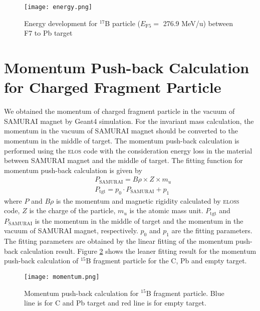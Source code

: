 \begin{figure}[h]
    \centering
    \texttt{[image: energy.png]}
    \caption{Energy development for $^{17}$B particle ($E_{\text{F5}} =$ 276.9 MeV/u) between F7 to Pb target}
    \label{fig:elos}
\end{figure}


\section{Momentum Push-back Calculation for Charged Fragment Particle}
We obtained the momentum of charged fragment particle in the vacuum of SAMURAI magnet by Geant4 simulation. For the invariant mass calculation, the momentum in the vacuum of SAMURAI magnet should be converted to the momentum in the middle of target. The momentum push-back calculation is performed using the \textsc{elos} code with the consideration energy loss in the material between SAMURAI magnet and the middle of target. The fitting function for momentum push-back calculation is given by
\begin{align}
    &P_{\text{SAMURAI}} = B\rho \times Z \times m_u\\
    &P_{\text{tgt}} = p_0 \cdot P_{\text{SAMURAI}} + p_1
\end{align}
where $P$ and $B\rho$ is the momentum and magnetic rigidity calculated by \textsc{eloss} code, $Z$ is the charge of the particle, $m_u$ is the atomic mass unit. $P_{\text{tgt}}$ and $P_{\text{SAMURAI}}$ is the momentum in the middle of target and the momentum in the vacuum of SAMURAI magnet, respectively. $p_0$ and $p_1$ are the fitting parameters. The fitting parameters are obtained by the linear fitting of the momentum push-back calculation result. Figure \ref{fig:momentum_pushback} shows the leaner fitting result for the momentum push-back calculation of $^{15}$B fragment particle for the C, Pb and empty target.

\begin{figure}[h]
    \centering
    \texttt{[image: momentum.png]}
    \caption[Momentum push-back calculation for $^{15}$B fragment particle]{Momentum push-back calculation for $^{15}$B fragment particle. Blue line is for C and Pb target and red line is for empty target.}
    \label{fig:momentum_pushback}
\end{figure}